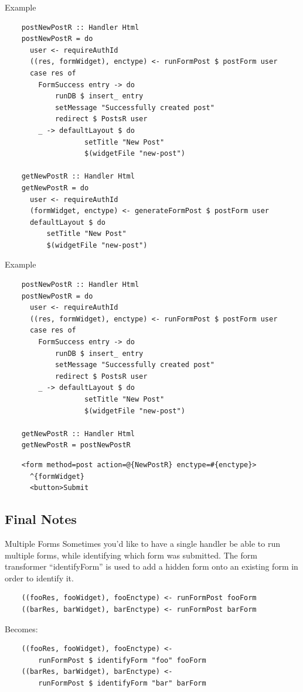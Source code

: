 \documentclass[pdf]{beamer}
\begin{document}
\begin{frame}[fragile]{Example}
  \begin{verbatim}
    postNewPostR :: Handler Html
    postNewPostR = do
      user <- requireAuthId
      ((res, formWidget), enctype) <- runFormPost $ postForm user
      case res of
        FormSuccess entry -> do
            runDB $ insert_ entry
            setMessage "Successfully created post"
            redirect $ PostsR user
        _ -> defaultLayout $ do
                   setTitle "New Post"
                   $(widgetFile "new-post")

    getNewPostR :: Handler Html
    getNewPostR = do
      user <- requireAuthId
      (formWidget, enctype) <- generateFormPost $ postForm user
      defaultLayout $ do
          setTitle "New Post"
          $(widgetFile "new-post")      
  \end{verbatim}
\end{frame}

\begin{frame}[fragile]{Example}
  \begin{verbatim}
    postNewPostR :: Handler Html
    postNewPostR = do
      user <- requireAuthId
      ((res, formWidget), enctype) <- runFormPost $ postForm user
      case res of
        FormSuccess entry -> do
            runDB $ insert_ entry
            setMessage "Successfully created post"
            redirect $ PostsR user
        _ -> defaultLayout $ do
                   setTitle "New Post"
                   $(widgetFile "new-post")
    
    getNewPostR :: Handler Html
    getNewPostR = postNewPostR
  \end{verbatim}
  \pause
  \begin{verbatim}
    <form method=post action=@{NewPostR} enctype=#{enctype}>
      ^{formWidget}
      <button>Submit
  \end{verbatim}
\end{frame}

\subsection{Final Notes}
\begin{frame}[fragile]{Multiple Forms}
  Sometimes you'd like to have a single handler be able to run
  multiple forms, while identifying which form was submitted. The form
  transformer ``identifyForm'' is used to add a hidden form onto an
  existing form in order to identify it.\\
  \begin{verbatim}
    ((fooRes, fooWidget), fooEnctype) <- runFormPost fooForm
    ((barRes, barWidget), barEnctype) <- runFormPost barForm
  \end{verbatim}
  Becomes:\\
  \begin{verbatim}
    ((fooRes, fooWidget), fooEnctype) <-
        runFormPost $ identifyForm "foo" fooForm
    ((barRes, barWidget), barEnctype) <-
        runFormPost $ identifyForm "bar" barForm
  \end{verbatim}
\end{frame}
\end{document}
